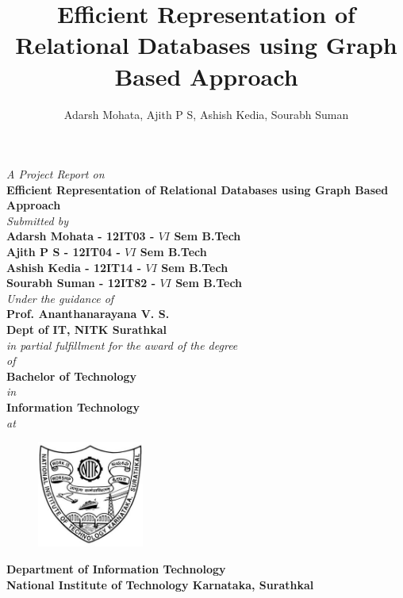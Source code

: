 \documentclass[12pt, oneside]{book}
\title{Efficient Representation of Relational Databases using Graph Based Approach}
\author{Adarsh Mohata, Ajith P S, Ashish Kedia, Sourabh Suman}
\newcommand{\project}{Efficient Representation of Relational Databases using Graph Based Approach}
\begin{document}
\begin{titlepage}
 \begin{center}
	\emph{A Project Report on} \\
\vspace{1cm}
\large
\textbf{\project} \\
\normalsize
\vspace{5mm}
\emph{Submitted by} \\
\vspace{5mm}
\textbf{Adarsh Mohata - 12IT03 - $VI$ Sem B.Tech} \\
\vspace{1mm}
\textbf{Ajith P S - 12IT04 - $VI$ Sem B.Tech} \\
\vspace{1mm}
\textbf{Ashish Kedia - 12IT14 - $VI$ Sem B.Tech} \\
\vspace{1mm}
\textbf{Sourabh Suman - 12IT82 - $VI$ Sem B.Tech} \\
\vspace{1cm}
\emph{Under the guidance of} \\
\vspace{1cm}
\textbf{Prof. Ananthanarayana V. S.} \\
\textbf{Dept of IT, NITK Surathkal} \\
\vspace{5mm}
\emph{in partial fulfillment for the award of the degree} \\
\vspace{5mm}
\emph{of} \\
\vspace{4mm}
\textbf{Bachelor of Technology} \\
\vspace{4mm}
\emph{in} \\
\vspace{4mm}
\textbf{Information Technology} \\
\vspace{5mm}
\emph{at} \\
\begin{figure}[H]
	\centering
	\includegraphics[height=3.5cm]{pics/nitk_logo.jpg}
\end{figure}
\vspace{1cm}
\textbf{Department of Information Technology} \\
\vspace{5mm}
\textbf{National Institute of Technology Karnataka, Surathkal} \\
\vspace{5mm}
\end{center}
\end{titlepage}
\end{document}
